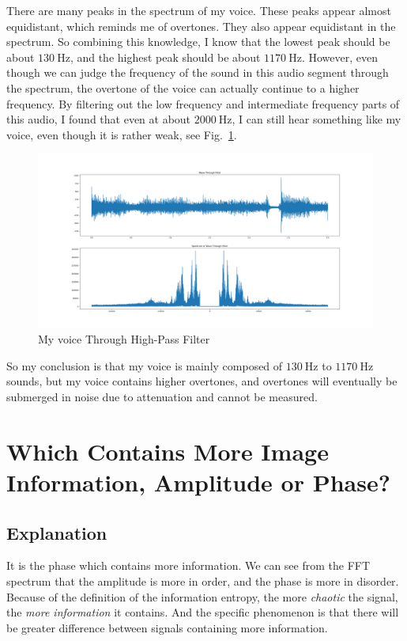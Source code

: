 \documentclass{article}
\begin{document}
There are many peaks in the spectrum of my voice. These peaks appear almost equidistant, which reminds me of overtones. They also appear equidistant in the spectrum. So combining this knowledge, I know that the lowest peak should be about $130~\mathrm{Hz}$, and the highest peak should be about $1170~\mathrm{Hz}$. However, even though we can judge the frequency of the sound in this audio segment through the spectrum, the overtone of the voice can actually continue to a higher frequency. By filtering out the low frequency and intermediate frequency parts of this audio, I found that even at about $2000~\mathrm{Hz}$, I can still hear something like my voice, even though it is rather weak, see Fig.~\ref{fig:filteredVoice}.

\begin{figure}[!h]
	\centering
	\includegraphics[width=5 in]{../pic/filteredVoice.png}
	\caption{My voice Through High-Pass Filter}
	\label{fig:filteredVoice}
\end{figure}

\newpage

So my conclusion is that my voice is mainly composed of $130~\mathrm{Hz}$ to $1170~\mathrm{Hz}$ sounds, but my voice contains higher overtones, and overtones will eventually be submerged in noise due to attenuation and cannot be measured.

\section{Which Contains More Image Information, Amplitude or Phase?}
\subsection{Explanation}
It is the phase which contains more information. We can see from the FFT spectrum that the amplitude is more in order, and the phase is more in disorder. Because of the definition of the information entropy, the more \emph{chaotic} the signal, the \emph{more information} it contains. And the specific phenomenon is that there will be greater difference between signals containing more information.
\end{document}
